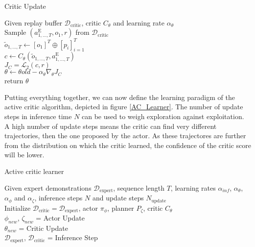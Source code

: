 \begin{algorithm}
    \caption{Critic Update}
    \label{Critic_Update_Alg}
    \begin{algorithmic}
    \Require Given replay buffer $\mathcal{D}_{\text{critic}}$, critic $C_{\theta}$ and learning rate $\alpha_{\theta}$\\
    \State Sample $(a^{\text{E}}_{1, ..., T}, o_1, r)$ from $\mathcal{D}_{\text{critic}}$\\
    \State $\tilde{o}_{1, ..., T} \gets [o_1]^T \oplus [p_i]_{i=1}^T$ \hfill{} \\
    \State $c \gets C_{\theta}(\tilde{o}_{1, ..., T}, a^{\text{E}}_{1, ..., T})$\hfill{} \\
    
    \State $J_{C} = \mathcal{L}_2(c, r)$ \hfill{} \\
    \State $\theta \gets \theta{old} - \alpha_{\theta} \nabla_{\theta}J_{C}$\\
    \State return $\theta$
\end{algorithmic}
\end{algorithm}
Putting everything together, we can now define the learning paradigm of the active critic algorithm, depicted in figure \ref{AC_Learner}. The number of update 
steps in inference time $N$ can be used to weigh exploration against exploitation. A high number of update steps means the critic can find very different 
trajectories, then the one proposed by the actor. As these trajectores are further from the distribution on which the critic learned, the confidence of the 
critic score will be lower.
\begin{algorithm}
    \caption{Active critic learner}
    \label{AC_Learner}
    \begin{algorithmic}
    \Require Given expert demonstrations $\mathcal{D}_{\text{expert}}$, sequence length $T$, learning rates $\alpha_{inf}$, $\alpha_{\theta}$, 
    $\alpha_{\phi}$ and $\alpha_{\zeta}$, inference steps $N$ and update steps $N_{\text{update}}$\\
    \State Initialize  $\mathcal{D}_{\text{critic}} = \mathcal{D}_{\text{expert}}$, 
    actor $\pi_{\phi}$, planner $P_{\zeta}$, critic $C_{\theta}$\\
    {
        {
            $\phi_{new}$, $\zeta_{new}$ = Actor Update \hfill{}\\
            $\theta_{new}$ = Critic Update \hfill{}\\
        }
        {
           $\mathcal{D}_{\text{expert}}$, $\mathcal{D}_{\text{critic}}$ = Inference Step \hfill{}\\
        }
    }
    \end{algorithmic}
\end{algorithm}

